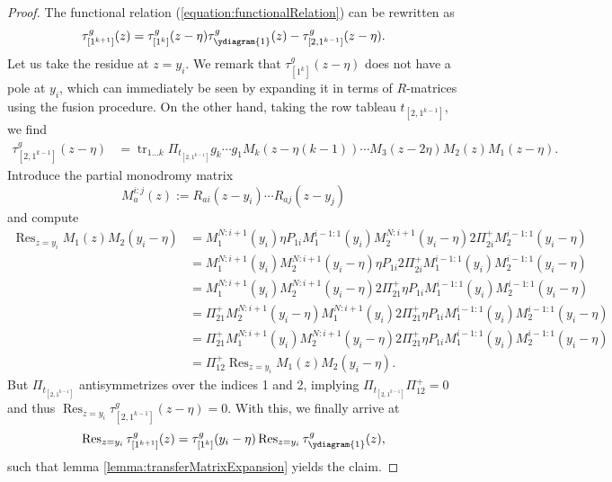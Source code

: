 \documentclass[11pt]{report}
\theoremstyle{definition}
\theoremstyle{remark}
\theoremstyle{remark}
\begin{document}
\begin{proof}
The functional relation (\ref{equation:functionalRelation}) can be rewritten as
\begin{equation*}
\tau_{[1^{k+1}]}^g(z) = \tau_{[1^k]}^g(z-\eta) \tau_{\ydiagram{1}}^g(z) - \tau_{[2,1^{k-1}]}^g(z-\eta).
\end{equation*}
Let us take the residue at $z=y_i$. We remark that $\tau_{[1^k]}^g(z-\eta)$ does not have a pole at $y_i$, which can immediately be seen by expanding it in terms of $R$-matrices using the fusion procedure. On the other hand, taking the row tableau $t_{[2,1^{k-1}]}$, we find
\begin{align*}
\tau_{[2,1^{k-1}]}^g(z-\eta)
&= \operatorname{tr}_{1...k} \Pi_{t_{[2,1^{k-1}]}} g_k \cdots g_1 M_k(z-\eta(k-1)) \cdots M_3(z-2\eta) M_2(z) M_1(z-\eta).
\end{align*}
Introduce the partial monodromy matrix
\begin{equation*}
M_a^{i:j}(z) := R_{ai}(z-y_i) \cdots R_{aj}(z-y_j)
\end{equation*}
and compute
\begin{align*}
\operatorname{Res}_{z=y_i} M_1(z) M_2(y_i-\eta)
&= M_1^{N:i+1}(y_i) \eta P_{1i} M_1^{i-1:1}(y_i) M_2^{N:i+1}(y_i-\eta) 2 \Pi_{2i}^+ M_2^{i-1:1}(y_i-\eta) \\
&= M_1^{N:i+1}(y_i) M_2^{N:i+1}(y_i-\eta) \eta P_{1i} 2 \Pi_{2i}^+ M_1^{i-1:1}(y_i) M_2^{i-1:1}(y_i-\eta) \\
&= M_1^{N:i+1}(y_i) M_2^{N:i+1}(y_i-\eta) 2 \Pi_{21}^+ \eta P_{1i} M_1^{i-1:1}(y_i) M_2^{i-1:1}(y_i-\eta) \\
&= \Pi_{21}^+ M_2^{N:i+1}(y_i-\eta) M_1^{N:i+1}(y_i) 2 \Pi_{21}^+ \eta P_{1i} M_1^{i-1:1}(y_i) M_2^{i-1:1}(y_i-\eta) \\
&= \Pi_{21}^+ M_1^{N:i+1}(y_i) M_2^{N:i+1}(y_i-\eta) 2 \Pi_{21}^+ \eta P_{1i} M_1^{i-1:1}(y_i) M_2^{i-1:1}(y_i-\eta) \\
&= \Pi_{12}^+ \operatorname{Res}_{z=y_i} M_1(z) M_2(y_i-\eta).
\end{align*}
But $\Pi_{t_{[2,1^{k-1}]}}$ antisymmetrizes over the indices 1 and 2, implying $\Pi_{t_{[2,1^{k-1}]}} \Pi_{12}^+ = 0$ and thus $\operatorname{Res}_{z=y_i} \tau_{[2,1^{k-1}]}^g(z-\eta) = 0$. With this, we finally arrive at
\begin{equation*}
\operatorname{Res}_{z=y_i} \tau_{[1^{k+1}]}^g(z)
= \tau_{[1^k]}^g(y_i-\eta) \operatorname{Res}_{z=y_i} \tau_{\ydiagram{1}}^g(z),
\end{equation*}
such that lemma \ref{lemma:transferMatrixExpansion} yields the claim.
\end{proof}
\end{document}
